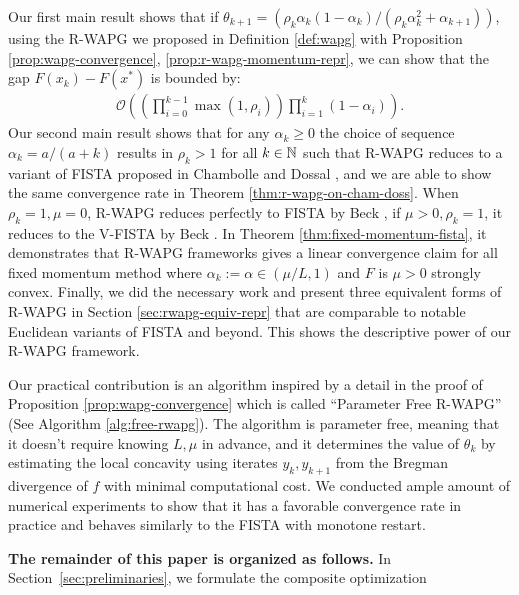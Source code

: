 \documentclass[12pt]{article}
\begin{document}
        Our first main result shows that if $\theta_{k + 1} = (\rho_k\alpha_k(1 - \alpha_k)/(\rho_k\alpha_k^2 + \alpha_{k + 1}))$, using the R-WAPG we proposed in Definition \ref{def:wapg} with Proposition \ref{prop:wapg-convergence}, \ref{prop:r-wapg-momentum-repr}, we can show that the gap $F(x_k) - F(x^*)$ is bounded by:
        \begin{align*}
            \mathcal O\left(
                \left(
                    \prod_{i = 0}^{k - 1} \max(1, \rho_{i})
                \right)
                \prod_{i = 1}^{k} \left(1  - \alpha_i\right)
            \right).
        \end{align*}
        Our second main result shows that for any $\alpha_k \ge 0$ the choice of sequence $\alpha_k = a/(a + k)$ results in $\rho_k > 1$ for all $k \in \mathbb N$ such that R-WAPG reduces to a variant of FISTA proposed in Chambolle and Dossal \cite{chambolle_convergence_2015}, and we are able to show the same convergence rate in Theorem \ref{thm:r-wapg-on-cham-doss}.
        When $\rho_k = 1, \mu = 0$, R-WAPG reduces perfectly to FISTA by Beck \cite{beck_first-order_2017}, if $\mu > 0, \rho_k = 1$, it reduces to the V-FISTA by Beck \cite{beck_first-order_2017}.
        In Theorem \ref{thm:fixed-momentum-fista}, it demonstrates that R-WAPG frameworks gives a linear convergence claim for all fixed momentum method where $\alpha_k := \alpha \in (\mu/L, 1)$ and  $F$ is $\mu > 0$ strongly convex.
        Finally, we did the necessary work and present three equivalent forms of R-WAPG in Section \ref{sec:rwapg-equiv-repr} that are comparable to notable Euclidean variants of FISTA and beyond. This shows the descriptive power of our R-WAPG framework.
        \par
        Our practical contribution is an algorithm inspired by a detail in the proof of Proposition \ref{prop:wapg-convergence} which is called ``Parameter Free R-WAPG'' (See Algorithm \ref{alg:free-rwapg}).
        The algorithm is parameter free, meaning that it doesn't require knowing $L, \mu$ in advance, and it determines the value of $\theta_k$ by estimating the local concavity using iterates $y_{k}, y_{k + 1}$ from the Bregman divergence of $f$ with minimal computational cost.
        We conducted ample amount of numerical experiments to show that it has a favorable convergence rate in practice and behaves similarly to the FISTA with monotone restart.
        \par
        \textbf{The remainder of this paper is organized as follows. }
        In Section~\ref{sec:preliminaries}, we formulate the composite optimization
\end{document}

